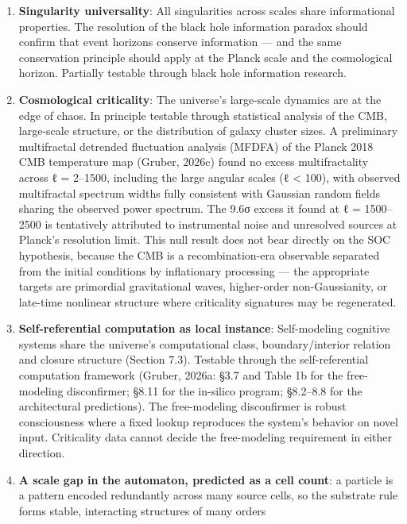 \documentclass[
]{article}
\begin{document}
\begin{enumerate}
\def\labelenumi{(\alph{enumi})}
\item
  \textbf{Singularity universality}: All singularities across scales
  share informational properties. The resolution of the black hole
  information paradox should confirm that event horizons conserve
  information --- and the same conservation principle should apply at
  the Planck scale and the cosmological horizon. Partially testable
  through black hole information research.
\item
  \textbf{Cosmological criticality}: The universe's large-scale dynamics
  are at the edge of chaos. In principle testable through statistical
  analysis of the CMB, large-scale structure, or the distribution of
  galaxy cluster sizes. A preliminary multifractal detrended fluctuation
  analysis (MFDFA) of the Planck 2018 CMB temperature map (Gruber,
  2026c) found no excess multifractality across ℓ = 2--1500, including
  the large angular scales (ℓ \textless{} 100), with observed
  multifractal spectrum widths fully consistent with Gaussian random
  fields sharing the observed power spectrum. The 9.6σ excess it found
  at ℓ = 1500--2500 is tentatively attributed to instrumental noise and
  unresolved sources at Planck's resolution limit. This null result does
  not bear directly on the SOC hypothesis, because the CMB is a
  recombination-era observable separated from the initial conditions by
  inflationary processing --- the appropriate targets are primordial
  gravitational waves, higher-order non-Gaussianity, or late-time
  nonlinear structure where criticality signatures may be regenerated.
\item
  \textbf{Self-referential computation as local instance}: Self-modeling
  cognitive systems share the universe's computational class,
  boundary/interior relation and closure structure (Section 7.3).
  Testable through the self-referential computation framework (Gruber,
  2026a: §3.7 and Table 1b for the free-modeling disconfirmer; §8.11 for
  the in-silico program; §8.2--8.8 for the architectural predictions).
  The free-modeling disconfirmer is robust consciousness where a fixed
  lookup reproduces the system's behavior on novel input. Criticality
  data cannot decide the free-modeling requirement in either direction.
\item
  \textbf{A scale gap in the automaton, predicted as a cell count}: a
  particle is a pattern encoded redundantly across many source cells, so
  the substrate rule forms stable, interacting structures of many orders

\end{enumerate}
\end{document}
